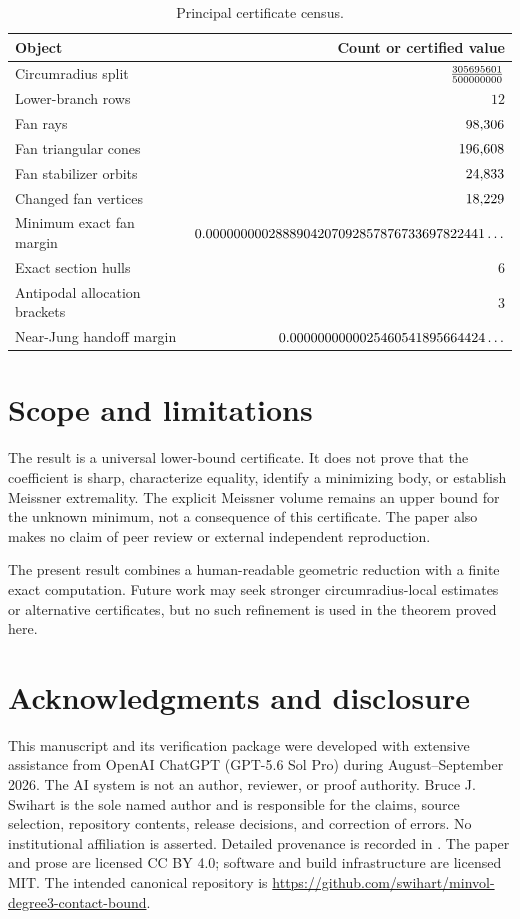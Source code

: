 \documentclass[11pt,reqno]{amsart}
\theoremstyle{remark}
\newcommand{\repositoryurl}{https://github.com/swihart/minvol-degree3-contact-bound}
\begin{document}
\begin{table}[ht]
\centering
\caption{Principal certificate census.}
\label{tab:census}
\begin{tabular}{@{}lr@{}}
\toprule
Object & Count or certified value\\
\midrule
Circumradius split & $\frac{305695601}{500000000}$\\
Lower-branch rows & $12$\\
Fan rays & $98{,}306$\\
Fan triangular cones & $196{,}608$\\
Fan stabilizer orbits & $24{,}833$\\
Changed fan vertices & $18{,}229$\\
Minimum exact fan margin & $0.0000000002888904207092857876733697822441\ldots$\\
Exact section hulls & $6$\\
Antipodal allocation brackets & $3$\\
Near-Jung handoff margin & $0.0000000000025460541895664424\ldots$\\
\bottomrule
\end{tabular}
\end{table}

\section{Scope and limitations}
\label{sec:limitations}

The result is a universal lower-bound certificate.  It does not prove that the
coefficient is sharp, characterize equality, identify a minimizing body, or
establish Meissner extremality.  The explicit Meissner volume remains an upper
bound for the unknown minimum, not a consequence of this certificate.  The
paper also makes no claim of peer review or external independent reproduction.

The present result combines a human-readable geometric reduction with a finite
exact computation.  Future work may seek stronger circumradius-local estimates
or alternative certificates, but no such refinement is used in the theorem
proved here.

\section*{Acknowledgments and disclosure}

This manuscript and its verification package were developed with extensive
assistance from OpenAI ChatGPT (GPT-5.6 Sol Pro) during August--September 2026.
The AI system is not an author, reviewer, or proof authority.  Bruce J. Swihart
is the sole named author and is responsible for the claims, source selection,
repository contents, release decisions, and correction of errors.  No
institutional affiliation is asserted.  Detailed provenance is recorded in
.  The paper and prose are licensed CC BY 4.0; software
and build infrastructure are licensed MIT.  The intended canonical repository
is \url{\repositoryurl}.
\end{document}

